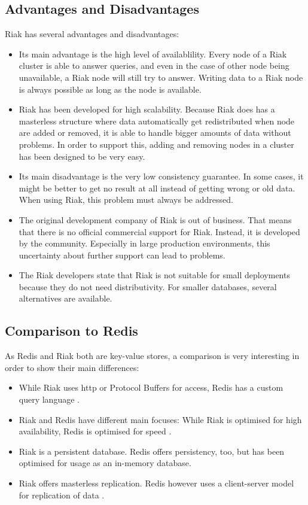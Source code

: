 \subsection{Advantages and Disadvantages}
Riak has several advantages and disadvantages:
\begin{itemize}
	\item Its main advantage is the high level of availablility. Every node of a Riak cluster is able to answer queries, and even in the case of other node being unavailable, a Riak node will still try to answer. Writing data to a Riak node is always possible as long as the node is available.
	\item Riak has been developed for high scalability. Because Riak does has a masterless structure where data automatically get redistributed when node are added or removed, it is able to handle bigger amounts of data without problems. In order to support this, adding and removing nodes in a cluster has been designed to be very easy.
	\item Its main disadvantage is the very low consistency guarantee. In some cases, it might be better to get no result at all instead of getting wrong or old data. When using Riak, this problem must always be addressed.
	\item The original development company of Riak is out of business. That means that there is no official commercial support for Riak. Instead, it is developed by the community. Especially in large production environments, this uncertainty about further support can lead to problems.
	\item The Riak developers state that Riak is not suitable for small deployments because they do not need distributivity. For smaller databases, several alternatives are available.
\end{itemize}

\subsection{Comparison to Redis}
As Redis and Riak both are key-value stores, a comparison is very interesting in order to show their main differences:
\begin{itemize}
	\item While Riak uses \gls{http} or Protocol Buffers for access, Redis has a custom query language \parencite{redis:protocol}.
	\item Riak and Redis have different main focuses: While Riak is optimised for high availability, Redis is optimised for speed \parencite{redis:introduction}.
	\item Riak is a persistent database. Redis offers persistency, too, but has been optimised for usage as an in-memory database.
	\item Riak offers masterless replication. Redis however uses a client-server model for replication of data \parencite{redis:clusterSpecification}.
\end{itemize}

